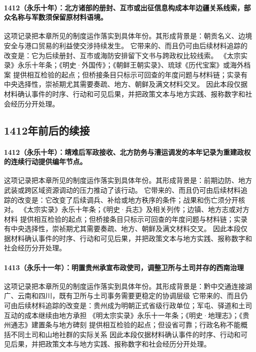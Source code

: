 \paragraph{1412（永乐十年）：北方诸部的册封、互市或出征信息构成本年边疆关系线索，部众名称与军数须保留原材料语境。} 这项记录把本章所见的制度运作落实到具体年份。其形成背景是：朝贡名义、边境安全与港口贸易的利益使交涉持续发生。 它带来的、而且仍可由后续材料追踪的改变是：它为后续册封、互市或海防安排留下文书与跨政权比较线索。 《太宗实录》永乐十年条；《明史·外国传》；《朝鲜王朝实录》、琉球《历代宝案》或海外档案 提供相互检验的起点；但桥接条目只标示可回查的年度问题与材料链；实录有中央选择性，崇祯期尤其需要奏疏、地方、朝鲜及满文材料交叉。 因此本段仅据材料确认事件的时序、行动和可见后果，并把政策文本与地方实践、报称数字和社会经历分开处理。

\subsection{1412年前后的续接}

\paragraph{1412（永乐十年）：靖难后军政接收、北方防务与漕运调发的本年记录为重建政权的连续行动提供编年节点。} 这项记录把本章所见的制度运作落实到具体年份。其形成背景是：前期边防、地方武装或跨区域资源调动的压力推动了该行动。 它带来的、而且仍可由后续材料追踪的改变是：它改变了后续调兵、补给或地方秩序的条件；战果和伤亡须分开核对。 《太宗实录》永乐十年条；《明史·兵志》及相关列传；边镇、地方志或对方材料 提供相互检验的起点；但桥接条目只标示可回查的年度问题与材料链；实录有中央选择性，崇祯期尤其需要奏疏、地方、朝鲜及满文材料交叉。 因此本段仅据材料确认事件的时序、行动和可见后果，并把政策文本与地方实践、报称数字和社会经历分开处理。

\paragraph{1413（永乐十一年）：明置贵州承宣布政使司，调整卫所与土司并存的西南治理} 这项记录把本章所见的制度运作落实到具体年份。其形成背景是：黔中交通连接湖广、云南和四川，既有卫所与土司事务需要更稳定的协调层级 它带来的、而且仍可由后续材料追踪的改变是：贵州成为明朝正式省级行政单位；军屯、驿道和土司互动的成本继续由地方承担 《明太宗实录》永乐十一年条；《明史·地理志》；《贵州通志》建置条与地方碑刻 提供相互检验的起点；但设省可靠；行政名称不能概括不同土司和山地社群的实际关系 因此本段仅据材料确认事件的时序、行动和可见后果，并把政策文本与地方实践、报称数字和社会经历分开处理。

